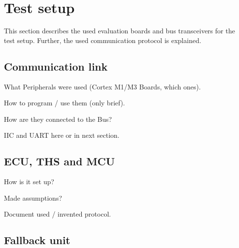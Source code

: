 \chapter{Test setup}

This section describes the used evaluation boards and bus transceivers for the test setup. Further, the used communication protocol is explained.

\section{Communication link}

What Peripherals were used (Cortex M1/M3 Boards, which ones).

How to program / use them (only brief).

How are they connected to the Bus?

IIC and UART here or in next section.

\section{ECU, THS and MCU}

How is it set up?

Made assumptions?

Document used / invented protocol.

\section{Fallback unit}